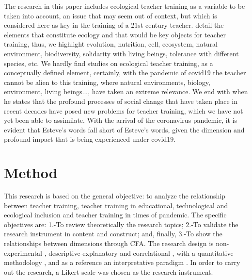 \documentclass{textolivre}
\begin{document}
The research in this paper includes ecological teacher training as a variable to be taken into account, an issue that may seem out of context, but which is considered here as key in the training of a 21st century teacher. \textcite{bermudez2008} %
detail the elements that constitute ecology and that would be key objects for teacher training, thus, we highlight evolution, nutrition, cell, ecosystem, natural environment, biodiversity, solidarity with living beings, tolerance with different species, etc. We hardly find studies on ecological teacher training, as a conceptually defined element, certainly, with the pandemic of covid19 the teacher cannot be alien to this training, where natural environments, biology, environment, living beings..., have taken an extreme relevance. We end with \textcite{esteve2009} %
when he states that the profound processes of social change that have taken place in recent decades have posed new problems for teacher training, which we have not yet been able to assimilate. With the arrival of the coronavirus pandemic, it is evident that Esteve's words fall short of Esteve's words, given the dimension and profound impact that is being experienced under covid19.

\section{Method}\label{sec2method}
This research is based on the general objective: to analyze the relationship between teacher training, teacher training in educational, technological and ecological inclusion and teacher training in times of pandemic. The specific objectives are: 1.-To review theoretically the research topics; 2.-To validate the research instrument in content and construct; and, finally, 3.-To show the relationships between dimensions through CFA. The research design is non-experimental \cite{kerlinger1979}, %
descriptive-explanatory \cite{arias2012} %
and correlational \cite{schuyler2008}, %
with a quantitative methodology \cite{hernandezsampieri2010}, %
and as a reference an interpretative paradigm \cite{perezserrano2004}. %
In order to carry out the research, a Likert scale was chosen as the research instrument.
\end{document}
